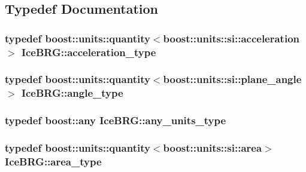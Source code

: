 \subsection{Typedef Documentation}
\hypertarget{namespaceIceBRG_ab10fe6d8fe6432a7dc0aa5a8ecac6a14}{}
\subsubsection[{acceleration\+\_\+type}]{\setlength{\rightskip}{0pt plus 5cm}typedef boost\+::units\+::quantity$<$boost\+::units\+::si\+::acceleration$>$ {\bf Ice\+B\+R\+G\+::acceleration\+\_\+type}}\label{namespaceIceBRG_ab10fe6d8fe6432a7dc0aa5a8ecac6a14}
\hypertarget{namespaceIceBRG_a688eeb0811a2474b20b667ed2e9625a1}{}
\subsubsection[{angle\+\_\+type}]{\setlength{\rightskip}{0pt plus 5cm}typedef boost\+::units\+::quantity$<$boost\+::units\+::si\+::plane\+\_\+angle$>$ {\bf Ice\+B\+R\+G\+::angle\+\_\+type}}\label{namespaceIceBRG_a688eeb0811a2474b20b667ed2e9625a1}
\hypertarget{namespaceIceBRG_a3101fc159e191fa99c4ec14e445df96e}{}
\subsubsection[{any\+\_\+units\+\_\+type}]{\setlength{\rightskip}{0pt plus 5cm}typedef boost\+::any {\bf Ice\+B\+R\+G\+::any\+\_\+units\+\_\+type}}\label{namespaceIceBRG_a3101fc159e191fa99c4ec14e445df96e}
\hypertarget{namespaceIceBRG_afed43f9e24ef5cdea34327ea9e9b1b83}{}
\subsubsection[{area\+\_\+type}]{\setlength{\rightskip}{0pt plus 5cm}typedef boost\+::units\+::quantity$<$boost\+::units\+::si\+::area$>$ {\bf Ice\+B\+R\+G\+::area\+\_\+type}}\label{namespaceIceBRG_afed43f9e24ef5cdea34327ea9e9b1b83}
\hypertarget{namespaceIceBRG_a02e79930ea75411b7883d2786b2fc5d7}{}
